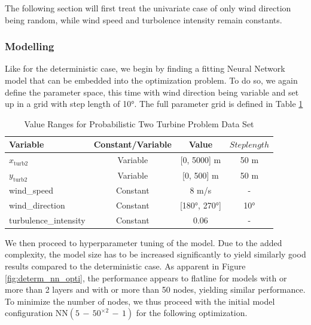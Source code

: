 The following section will first treat the univariate case of only wind direction being random, while wind speed and turbolence intensity remain constants. 

\subsubsection{Modelling}

Like for the deterministic case, we begin by finding a fitting Neural Network model that can be embedded into the optimization problem. To do so, we again define the parameter space, this time with wind direction being variable and set up in a grid with step length of 10°. The full parameter grid is defined in Table \ref{tab:val_prob_data}

\begin{table}[ht]
	\centering
	\caption{Value Ranges for Probabilistic Two Turbine Problem Data Set}
	\begin{tabular}{|l|c|c|c|}
		\hline
		\textbf{Variable} & \textbf{Constant/Variable} & \textbf{Value} & \textbf{$Steplength$}\\
		\hline
		$x_{\text{turb2}}$ & Variable & [0, 5000] m & 50 m\\
		$y_{\text{turb2}}$ & Variable & [0, 500] m  & 50 m\\
		wind\_speed & Constant & 8 m/s & -\\
		wind\_direction & Constant & [180°, 270°]& 10° \\
		turbulence\_intensity & Constant & 0.06 & - \\
		\hline
	\end{tabular}
	\label{tab:val_prob_data}
\end{table}

We then proceed to hyperparameter tuning of the model. Due to the added complexity, the model size has to be increased significantly to yield similarly good results compared to the deterministic case. As apparent in Figure \ref{fig:determ_nn_opti}, the performance appears to flatline for models with or more than 2 layers and with or more than 50 nodes, yielding similar performance. To minimize the number of nodes, we thus proceed with the initial model configuration $\text{NN}(5\,{-}\,50^{\times2}\,{-}\,1)$ for the following optimization.


